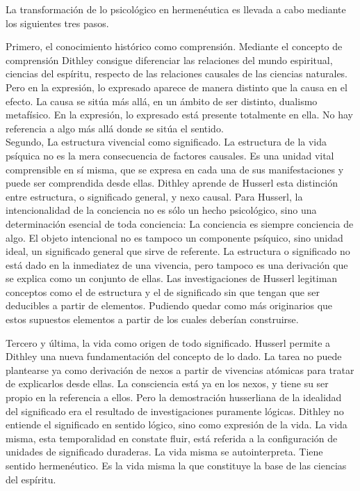 \documentclass[a4paper, 11pt, twocolumn, spanish]{article}
\begin{document}
La transformación de lo psicológico en hermenéutica es llevada a cabo
mediante los siguientes tres pasos.

Primero, el conocimiento histórico como comprensión. Mediante el
concepto de comprensión Dithley consigue diferenciar las relaciones
del mundo espiritual, ciencias del espíritu, respecto de las
relaciones causales de las ciencias naturales. Pero en la expresión,
lo expresado aparece de manera distinto que la causa en el efecto. La
causa se sitúa más allá, en un ámbito de ser distinto, dualismo
metafísico. En la expresión, lo expresado está presente totalmente en
ella. No hay referencia a algo más allá donde se sitúa el sentido.\\[0pt]

Segundo, La estructura vivencial como significado. La estructura de la
vida psíquica no es la mera consecuencia de factores causales. Es una
unidad vital comprensible en sí misma, que se expresa en cada una de
sus manifestaciones y puede ser comprendida desde ellas. Dithley
aprende de Husserl esta distinción entre estructura, o significado
general, y nexo causal. Para Husserl, la intencionalidad de la
conciencia no es sólo un hecho psicológico, sino una determinación
esencial de toda conciencia: La conciencia es siempre conciencia de
algo. El objeto intencional no es tampoco un componente psíquico, sino
unidad ideal, un significado general que sirve de referente. La
estructura o significado no está dado en la inmediatez de una
vivencia, pero tampoco es una derivación que se explica como un
conjunto de ellas. Las investigaciones de Husserl legitiman conceptos
como el de estructura y el de significado sin que tengan que ser
deducibles a partir de elementos. Pudiendo quedar como más originarios
que estos supuestos elementos a partir de los cuales deberían
construirse.

Tercero y última, la vida como origen de todo significado. Husserl
permite a Dithley una nueva fundamentación del concepto de lo dado. La
tarea no puede plantearse ya como derivación de nexos a partir de
vivencias atómicas para tratar de explicarlos desde ellas. La
consciencia está ya en los nexos, y tiene su ser propio en la
referencia a ellos. Pero la demostración husserliana de la idealidad
del significado era el resultado de investigaciones puramente
lógicas. Dithley no entiende el significado en sentido lógico, sino
como expresión de la vida. La vida misma, esta temporalidad en
constate fluir, está referida a la configuración de unidades de
significado duraderas. La vida misma se autointerpreta. Tiene sentido
hermenéutico. Es la vida misma la que constituye la base de las
ciencias del espíritu.
\end{document}
